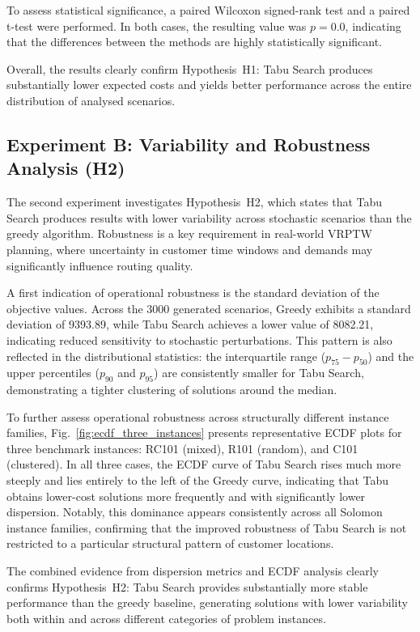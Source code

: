 To assess statistical significance, a paired Wilcoxon signed-rank test and a paired t-test were performed. In both cases, the resulting value was $p = 0.0$, indicating that the differences between the methods are highly statistically significant.

Overall, the results clearly confirm Hypothesis~H1: Tabu Search produces substantially lower expected costs and yields better performance across the entire distribution of analysed scenarios.

\subsection{Experiment B: Variability and Robustness Analysis (H2)}

The second experiment investigates Hypothesis~H2, which states that Tabu Search produces results with lower variability across stochastic scenarios than the greedy algorithm. Robustness is a key requirement in real-world VRPTW planning, where uncertainty in customer time windows and demands may significantly  influence routing quality.

A first indication of operational robustness is the standard deviation of the objective values. Across the 3000 generated scenarios, Greedy exhibits a standard deviation of 9393.89, while Tabu Search achieves a lower value of 8082.21, indicating reduced sensitivity to stochastic perturbations. This pattern is also reflected in the distributional statistics: the interquartile range ($p_{75}-p_{50}$) and the upper percentiles ($p_{90}$ and $p_{95}$) are consistently smaller for Tabu Search, demonstrating a tighter clustering of solutions around the median.

To further assess operational robustness across structurally different instance families, Fig.~\ref{fig:ecdf_three_instances} presents representative ECDF plots for three benchmark instances: RC101 (mixed), R101 (random), and C101 (clustered). In all three cases, the ECDF curve of Tabu Search rises much more steeply and lies entirely to the left of the Greedy curve, indicating that Tabu obtains lower-cost solutions more frequently and with significantly lower dispersion. Notably, this dominance appears consistently across all Solomon instance families, confirming that the improved robustness of Tabu Search is not restricted to a particular structural pattern of customer locations.

The combined evidence from dispersion metrics and ECDF analysis clearly confirms Hypothesis~H2: Tabu Search provides substantially more stable performance than the greedy baseline, generating solutions with lower variability both within and across different categories of problem instances.

